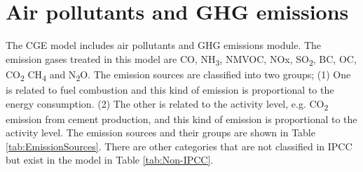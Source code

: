 \documentclass[10pt,a4paper,titlepage,dvipdfmx]{book}
\begin{document}
\section{\label{sec:Stru-AirPolGHGEmi}Air pollutants and GHG emissions}

The CGE model includes air pollutants and GHG emissions module. The emission gases treated in this model are CO, NH\textsubscript{3}, NMVOC, NOx, SO\textsubscript{2}, BC, OC, CO\textsubscript{2} CH\textsubscript{4} and N\textsubscript{2}O. The emission sources are classified into two groups; (1) One is related to fuel combustion and this kind of emission is proportional to the energy consumption. (2) The other is related to the activity level, e.g. CO\textsubscript{2} emission from cement production, and this kind of emission is proportional to the activity level. The emission sources and their groups are shown in Table \ref{tab:EmissionSources}. There are other categories that are not classified in IPCC but exist in the model in Table \ref{tab:Non-IPCC}.
\end{document}
